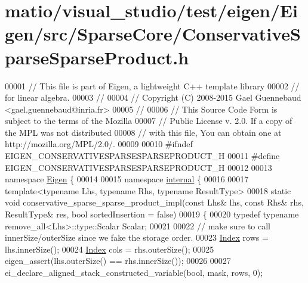 \hypertarget{matio_2visual__studio_2test_2eigen_2_eigen_2src_2_sparse_core_2_conservative_sparse_sparse_product_8h_source}{}\section{matio/visual\+\_\+studio/test/eigen/\+Eigen/src/\+Sparse\+Core/\+Conservative\+Sparse\+Sparse\+Product.h}
\label{matio_2visual__studio_2test_2eigen_2_eigen_2src_2_sparse_core_2_conservative_sparse_sparse_product_8h_source}

\begin{DoxyCode}
00001 \textcolor{comment}{// This file is part of Eigen, a lightweight C++ template library}
00002 \textcolor{comment}{// for linear algebra.}
00003 \textcolor{comment}{//}
00004 \textcolor{comment}{// Copyright (C) 2008-2015 Gael Guennebaud <gael.guennebaud@inria.fr>}
00005 \textcolor{comment}{//}
00006 \textcolor{comment}{// This Source Code Form is subject to the terms of the Mozilla}
00007 \textcolor{comment}{// Public License v. 2.0. If a copy of the MPL was not distributed}
00008 \textcolor{comment}{// with this file, You can obtain one at http://mozilla.org/MPL/2.0/.}
00009 
00010 \textcolor{preprocessor}{#ifndef EIGEN\_CONSERVATIVESPARSESPARSEPRODUCT\_H}
00011 \textcolor{preprocessor}{#define EIGEN\_CONSERVATIVESPARSESPARSEPRODUCT\_H}
00012 
00013 \textcolor{keyword}{namespace }\hyperlink{namespace_eigen}{Eigen} \{ 
00014 
00015 \textcolor{keyword}{namespace }\hyperlink{namespaceinternal}{internal} \{
00016 
00017 \textcolor{keyword}{template}<\textcolor{keyword}{typename} Lhs, \textcolor{keyword}{typename} Rhs, \textcolor{keyword}{typename} ResultType>
00018 \textcolor{keyword}{static} \textcolor{keywordtype}{void} conservative\_sparse\_sparse\_product\_impl(\textcolor{keyword}{const} Lhs& lhs, \textcolor{keyword}{const} Rhs& rhs, ResultType& res, \textcolor{keywordtype}{bool} 
      sortedInsertion = \textcolor{keyword}{false})
00019 \{
00020   \textcolor{keyword}{typedef} \textcolor{keyword}{typename} remove\_all<Lhs>::type::Scalar Scalar;
00021 
00022   \textcolor{comment}{// make sure to call innerSize/outerSize since we fake the storage order.}
00023   \hyperlink{namespace_eigen_a62e77e0933482dafde8fe197d9a2cfde}{Index} rows = lhs.innerSize();
00024   \hyperlink{namespace_eigen_a62e77e0933482dafde8fe197d9a2cfde}{Index} cols = rhs.outerSize();
00025   eigen\_assert(lhs.outerSize() == rhs.innerSize());
00026   
00027   ei\_declare\_aligned\_stack\_constructed\_variable(\textcolor{keywordtype}{bool},   mask,     rows, 0);

\end{DoxyCode}
